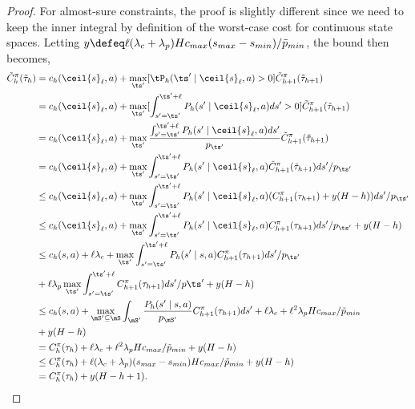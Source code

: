 \documentclass[pdftex, a4paper, 12pt]{article}
\newcommand{\round}[2]{\ceil{#2}_{#1}}
\newcommand{\cmax}{c_{max}}
\newcommand{\tC}{\Tilde{C}}
\newcommand{\smax}{s_{max}}
\newcommand{\smin}{s_{min}}
\begin{document}
\begin{proof}
    For almost-sure constraints, the proof is slightly different since we need to keep the inner integral by definition of the worst-case cost for continuous state spaces. Letting $y \defeq \ell (\lambda_c + \lambda_p)H\cmax(\smax - \smin)/\Tilde{p}_{min}$, the bound then becomes,
    \begin{align*}
        \tC^{\pi}_h(\Tilde{\tau}_h) &=  c_h(\round{\ell}{s}, a) + \max_{\ts'}[\tP_h(\ts' \mid \round{\ell}{s}, a) > 0]\tC^{\pi}_{h+1}(\Tilde{\tau}_{h+1}) \\
        &= c_h(\round{\ell}{s}, a) + \max_{\ts'}[\int_{s' = \ts'}^{\ts' + \ell} P_h(s' \mid \round{\ell}{s}, a)ds' > 0]\tC^{\pi}_{h+1}(\Tilde{\tau}_{h+1}) \\
        &= c_h(\round{\ell}{s}, a) + \max_{\ts'}\frac{\int_{s' = \ts'}^{\ts' + \ell} P_h(s' \mid \round{\ell}{s}, a)ds'}{p_{\ts'}}\tC^{\pi}_{h+1}(\Tilde{\tau}_{h+1}) \\
        &= c_h(\round{\ell}{s}, a) + \max_{\ts'}\int_{s' = \ts'}^{\ts' + \ell} P_h(s' \mid \round{\ell}{s}, a)\tC^{\pi}_{h+1}(\Tilde{\tau}_{h+1})ds'/p_{\ts'} \\
        &\leq c_h(\round{\ell}{s}, a) + \max_{\ts'}\int_{s' = \ts'}^{\ts' + \ell} P_h(s' \mid \round{\ell}{s}, a)(C^{\pi}_{h+1}(\tau_{h+1})+y(H-h))ds'/p_{\ts'}\\
        &\leq c_h(\round{\ell}{s}, a) + \max_{\ts'}\int_{s' = \ts'}^{\ts' + \ell} P_h(s' \mid \round{\ell}{s}, a)C^{\pi}_{h+1}(\tau_{h+1})ds'/p_{\ts'} + y(H-h)\\
        &\leq c_h(s,a) + \ell\lambda_c + \max_{\ts'} \int_{s' = \ts'}^{\ts' + \ell} P_h(s' \mid s, a) C_{h+1}^{\pi}(\tau_{h+1})ds'/p_{\ts'} \\
        &+\ell \lambda_p \max_{\ts'} \int_{s' = \ts'}^{\ts' + \ell} C_{h+1}^{\pi}(\tau_{h+1})ds'/p{\ts'} + y(H-h)\\
        &\leq c_h(s,a) + \max_{\mS' \subseteq \mS} \int_{\mS'} \frac{P_h(s' \mid s,a)}{p_{\mS'}} C_{h+1}^{\pi}(\tau_{h+1})ds' + \ell \lambda_c + \ell^2 \lambda_p H\cmax/\Tilde{p}_{min}\\
        & + y(H-h)\\
        &= C_h^{\pi}(\tau_h) + \ell \lambda_c + \ell^2 \lambda_p H\cmax/\Tilde{p}_{min}+ y(H-h)\\
        &\leq C_h^{\pi}(\tau_h) + \ell(\lambda_c + \lambda_p)(\smax - \smin)H\cmax/\Tilde{p}_{min} + y(H-h) \\
        &=  C_h^{\pi}(\tau_h) + y(H-h+1).
    \end{align*}

\end{proof}
\end{document}
